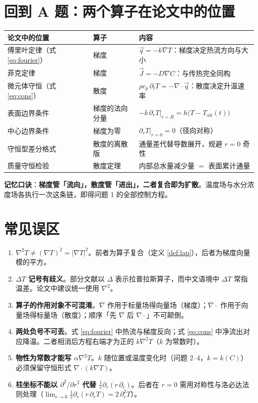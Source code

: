\documentclass[12pt,a4paper]{ctexart}
\begin{document}
\section{回到 A 题：两个算子在论文中的位置}

\begin{center}
\begin{tabular}{p{4.6cm}p{2.6cm}p{8.6cm}}
\toprule
论文中的位置 & 算子 & 内容 \\
\midrule
傅里叶定律（式 \eqref{eq:fourier}） & 梯度 & $\vec{q}=-k\nabla T$：梯度决定热流方向与大小 \\
菲克定律 & 梯度 & $\vec{J}=-D\nabla C$：与传热完全同构 \\
微元体守恒（式 \eqref{eq:cons}） & 散度 & $\rho c_p\,\partial_t T=-\nabla\cdot\vec{q}$：散度决定升温速率 \\
表面边界条件 & 梯度的法向分量 & $-k\,\partial_r T\big|_{r=R}=h\big(T-T_{\mathrm{air}}(t)\big)$ \\
中心边界条件 & 梯度为零 & $\partial_r T\big|_{r=0}=0$（径向对称） \\
守恒型差分格式 & 散度的离散版 & 通量差代替导数展开，规避 $r=0$ 奇性 \\
质量守恒检验 & 散度定理 & 内部总水量减少量 $=$ 表面累计通量 \\
\bottomrule
\end{tabular}
\end{center}

\textbf{记忆口诀}：\textbf{梯度管「流向」，散度管「进出」，二者复合即为扩散}。温度场与水分浓度场各执行一次这条链，即得问题 1 的全部控制方程。

\section{常见误区}

\begin{enumerate}[leftmargin=2.5em]
\item \textbf{$\nabla^2 T\neq(\nabla T)^2=|\nabla T|^2$}。前者为算子复合（定义 \ref{def:lap}），后者为梯度向量模的平方。
\item \textbf{$\Delta T$ 记号有歧义}。部分文献以 $\Delta$ 表示拉普拉斯算子，而中文语境中 $\Delta T$ 常指温差。论文中建议统一使用 $\nabla^2$。
\item \textbf{算子的作用对象不可混淆}。$\nabla$ 作用于标量场得向量场（梯度）；$\nabla\cdot$ 作用于向量场得标量场（散度）；顺序「先 $\nabla$ 后 $\nabla\cdot$」不可颠倒。
\item \textbf{两处负号不可丢}。式 \eqref{eq:fourier} 中热流与梯度反向；式 \eqref{eq:cons} 中净流出对应降温。二者相消后方程右端才为正的 $k\nabla^2 T$（$k$ 为常数时）。
\item \textbf{物性为常数才能写 $\alpha\nabla^2 T$}。$k$ 随位置或温度变化时（问题 2--4，$k=k(C)$）必须保留守恒形式 $\nabla\cdot(k\nabla T)$。
\item \textbf{柱坐标不能以 $\partial^2/\partial r^2$ 代替 $\frac{1}{r}\partial_r(r\,\partial_r)$}。后者在 $r=0$ 需用对称性与洛必达法则处理（$\lim_{r\to0}\frac{1}{r}\partial_r(r\,\partial_r T)=2\,\partial_r^2 T$）。
\end{enumerate}
\end{document}
